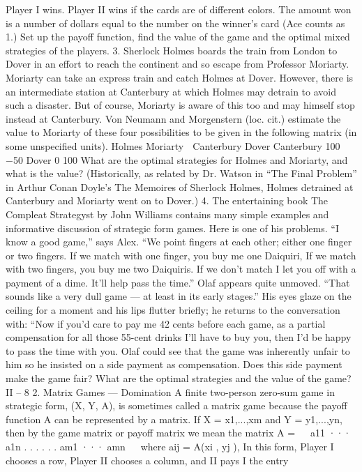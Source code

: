 Player I wins. Player II wins if the cards are of different colors. The amount won is a
number of dollars equal to the number on the winner’s card (Ace counts as 1.) Set up the
payoff function, find the value of the game and the optimal mixed strategies of the players.
3. Sherlock Holmes boards the train from London to Dover in an effort to reach the
continent and so escape from Professor Moriarty. Moriarty can take an express train and
catch Holmes at Dover. However, there is an intermediate station at Canterbury at which
Holmes may detrain to avoid such a disaster. But of course, Moriarty is aware of this too
and may himself stop instead at Canterbury. Von Neumann and Morgenstern (loc. cit.)
estimate the value to Moriarty of these four possibilities to be given in the following matrix
(in some unspecified units).
Holmes
Moriarty 
Canterbury Dover
Canterbury 100 −50
Dover 0 100
What are the optimal strategies for Holmes and Moriarty, and what is the value? (Historically,
as related by Dr. Watson in “The Final Problem” in Arthur Conan Doyle’s The
Memoires of Sherlock Holmes, Holmes detrained at Canterbury and Moriarty went on to
Dover.)
4. The entertaining book The Compleat Strategyst by John Williams contains many
simple examples and informative discussion of strategic form games. Here is one of his
problems.
“I know a good game,” says Alex. “We point fingers at each other; either
one finger or two fingers. If we match with one finger, you buy me one Daiquiri,
If we match with two fingers, you buy me two Daiquiris. If we don’t match I let
you off with a payment of a dime. It’ll help pass the time.”
Olaf appears quite unmoved. “That sounds like a very dull game — at least
in its early stages.” His eyes glaze on the ceiling for a moment and his lips flutter
briefly; he returns to the conversation with: “Now if you’d care to pay me 42
cents before each game, as a partial compensation for all those 55-cent drinks I’ll
have to buy you, then I’d be happy to pass the time with you.
Olaf could see that the game was inherently unfair to him so he insisted on a side
payment as compensation. Does this side payment make the game fair? What are the
optimal strategies and the value of the game?
II – 8
2. Matrix Games — Domination
A finite two-person zero-sum game in strategic form, (X, Y, A), is sometimes called
a matrix game because the payoff function A can be represented by a matrix. If X =
{x1,...,xm} and Y = {y1,...,yn}, then by the game matrix or payoff matrix we mean
the matrix
A =
⎛
⎝
a11 ··· a1n
.
.
. .
.
.
am1 ··· amn
⎞
⎠ where aij = A(xi , yj ),
In this form, Player I chooses a row, Player II chooses a column, and II pays I the entry
